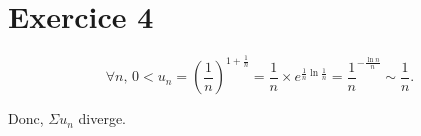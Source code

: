 \part{Exercice 4}

\[
	\forall n,\, 0< u_n = \left( \frac{1}{n} \right)^{1+\frac{1}{n}} = \frac{1}{n} \times e^{\frac{1}{n} \ln\frac{1}{n}} = \frac{1}{n}^{-\frac{\ln n}{n}} \sim \frac{1}{n}.
\]

Donc, $\Sigma u_n$ diverge.

